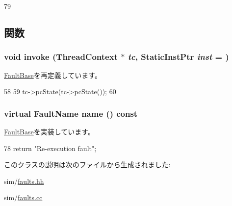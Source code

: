 \begin{DoxyCode}
79 {}
\end{DoxyCode}


\subsection{関数}
\hypertarget{classReExec_a2bd783b42262278d41157d428e1f8d6f}{
\subsubsection[{invoke}]{\setlength{\rightskip}{0pt plus 5cm}void invoke ({\bf ThreadContext} $\ast$ {\em tc}, \/  {\bf StaticInstPtr} {\em inst} = {})}}
\label{classReExec_a2bd783b42262278d41157d428e1f8d6f}


\hyperlink{classFaultBase_a2bd783b42262278d41157d428e1f8d6f}{FaultBase}を再定義しています。


\begin{DoxyCode}
58 {
59     tc->pcState(tc->pcState());
60 }
\end{DoxyCode}
\hypertarget{classReExec_a127f8e4ea265460c26320765ce2a45c7}{
\subsubsection[{name}]{\setlength{\rightskip}{0pt plus 5cm}virtual {\bf FaultName} name () const}}
\label{classReExec_a127f8e4ea265460c26320765ce2a45c7}


\hyperlink{classFaultBase_aad960357563b8b969d2dffdcc6861de7}{FaultBase}を実装しています。


\begin{DoxyCode}
78 { return "Re-execution fault";}
\end{DoxyCode}


このクラスの説明は次のファイルから生成されました:\begin{DoxyCompactItemize}
\item 
sim/\hyperlink{sim_2faults_8hh}{faults.hh}\item 
sim/\hyperlink{sim_2faults_8cc}{faults.cc}\end{DoxyCompactItemize}
